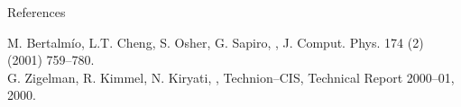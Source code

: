 \documentclass{beamer}
\begin{document}
\begin{frame}{References}
\begin{thebibliography}{10}

 M. Bertalm\'io, L.T. Cheng, S. Osher, G. Sapiro, 
, 
\newblock J. Comput. Phys. 174 (2) (2001) 759--780.\\

 G. Zigelman, R. Kimmel, N. Kiryati,
, 
\newblock Technion--CIS, Technical Report 2000--01, 2000.
\end{thebibliography}
\end{frame}
\end{document}
